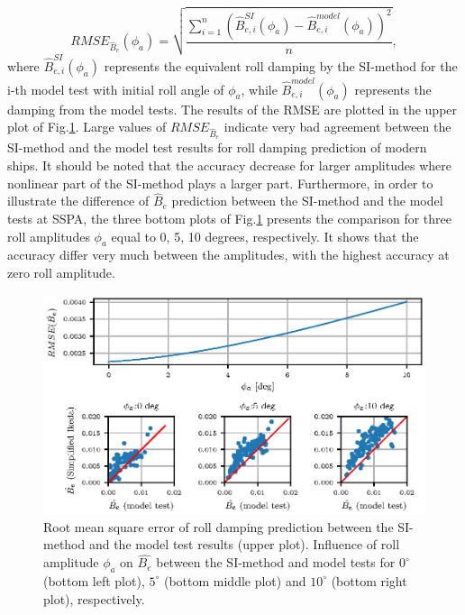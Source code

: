 \begin{equation} \label{eq:rmse}
    RMSE_{\hat{B}_e} (\phi_a) = \sqrt{\frac{\sum\limits_{i=1}^n (\hat{B}_{e,i}^{SI} (\phi_a) - \hat{B}_{e,i}^{model} (\phi_a))^2}{n}},
\end{equation}
where $\hat{B}_{e,i}^{SI} (\phi_a)$ represents the equivalent roll damping by the SI-method for the i-th model test with initial roll angle of $\phi_a$, while $\hat{B}_{e,i}^{model} (\phi_a)$ represents the damping from the model tests. The results of the RMSE are plotted in the upper plot of Fig.\ref{fig:ikeda_phi_a}. Large values of $RMSE_{\hat{B}_e}$ indicate very bad agreement between the SI-method and the model test results for roll damping prediction of modern ships. It should be noted that the accuracy decrease for larger amplitudes where nonlinear part of the SI-method plays a larger part. Furthermore, in order to illustrate the difference of $\hat{B}_e$ prediction between the SI-method and the model tests at SSPA, the three bottom plots of Fig.\ref{fig:ikeda_phi_a} presents the comparison for three roll amplitudes $\phi_a$ equal to 0, 5, 10 degrees, respectively. It shows that the accuracy differ very much between the amplitudes, with the highest accuracy at zero roll amplitude. 


\begin{figure}[H]
\centering
  \centering
  \includegraphics[]{figures/ikeda_phi_a.eps}
  \vspace{-0.5cm}
  \caption{Root mean square error of roll damping prediction between the SI-method and the model test results (upper plot). Influence of roll amplitude $\phi_a$ on $\hat{B_e}$ between the SI-method and model tests for $0^{\circ}$ (bottom left plot), $5^{\circ}$ (bottom middle plot) and $10^{\circ}$ (bottom right plot), respectively.}
  \label{fig:ikeda_phi_a}
\end{figure}

